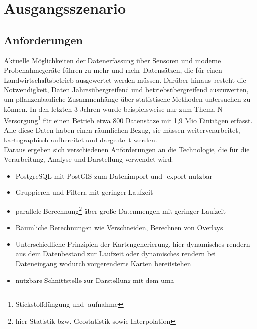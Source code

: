 \chapter{Ausgangsszenario}

\section{Anforderungen}
\label{Anforderungen}

Aktuelle Möglichkeiten der Datenerfassung über Sensoren und moderne Probenahmegeräte führen zu mehr und mehr Datensätzen, die für einen Landwirtschaftsbetrieb ausgewertet werden müssen. Darüber hinaus besteht die Notwendigkeit, Daten Jahresübergreifend und betriebsübergreifend auszuwerten, um pflanzenbauliche Zusammenhänge über statistische Methoden untersuchen zu können.
In den letzten 3 Jahren wurde beispielsweise nur zum Thema N-Versorgung\footnote{Stickstoffdüngung und -aufnahme} für einen Betrieb etwa 800 Datensätze mit 1,9 Mio Einträgen erfasst. Alle diese Daten haben einen räumlichen Bezug, sie müssen weiterverarbeitet, kartographisch aufbereitet und dargestellt werden.\\
Daraus ergeben sich verschiedenen Anforderungen an die Technologie, die für die Verarbeitung, Analyse und Darstellung verwendet wird:
\begin{itemize}
\item PostgreSQL mit PostGIS zum Datenimport und -export nutzbar
\item Gruppieren und Filtern mit geringer Laufzeit
\item parallele Berechnung\footnote{hier Statistik bzw. Geostatistik sowie Interpolation} über große Datenmengen mit geringer Laufzeit
\item Räumliche Berechnungen wie Verschneiden, Berechnen von Overlays
\item  Unterschiedliche Prinzipien der Kartengenerierung, hier dynamisches rendern aus dem Datenbestand zur Laufzeit oder dynamisches rendern bei Dateneingang wodurch vorgerenderte Karten bereitstehen %
\item nutzbare Schnittstelle zur Darstellung mit dem \Gls{umn}
\end{itemize}



